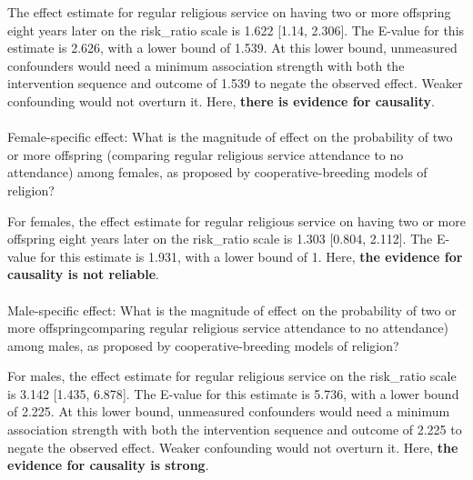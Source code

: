 \documentclass[
  single column]{article}
\makeatletter
\let\oldparagraph\paragraph
\renewcommand{\paragraph}{
    \@ifstar
      \xxxParagraphStar
      \xxxParagraphNoStar
  }
\newcommand{\xxxParagraphStar}[1]{\oldparagraph*{#1}\mbox{}}
\newcommand{\xxxParagraphNoStar}[1]{\oldparagraph{#1}\mbox{}}
\makeatother
\begin{document}
The effect estimate for regular religious service on having two or more
offspring eight years later on the risk\_ratio scale is 1.622 {[}1.14,
2.306{]}. The E-value for this estimate is 2.626, with a lower bound of
1.539. At this lower bound, unmeasured confounders would need a minimum
association strength with both the intervention sequence and outcome of
1.539 to negate the observed effect. Weaker confounding would not
overturn it. Here, \textbf{there is evidence for causality}.

\paragraph{Female-specific effect: What is the magnitude of effect on
the probability of two or more offspring (comparing regular religious
service attendance to no attendance) among females, as proposed by
cooperative-breeding models of
religion?}\label{female-specific-effect-what-is-the-magnitude-of-effect-on-the-probability-of-two-or-more-offspring-comparing-regular-religious-service-attendance-to-no-attendance-among-females-as-proposed-by-cooperative-breeding-models-of-religion}

For females, the effect estimate for regular religious service on having
two or more offspring eight years later on the risk\_ratio scale is
1.303 {[}0.804, 2.112{]}. The E-value for this estimate is 1.931, with a
lower bound of 1. Here, \textbf{the evidence for causality is not
reliable}.

\paragraph{Male-specific effect: What is the magnitude of effect on the
probability of two or more offspringcomparing regular religious service
attendance to no attendance) among males, as proposed by
cooperative-breeding models of
religion?}\label{male-specific-effect-what-is-the-magnitude-of-effect-on-the-probability-of-two-or-more-offspringcomparing-regular-religious-service-attendance-to-no-attendance-among-males-as-proposed-by-cooperative-breeding-models-of-religion}

For males, the effect estimate for regular religious service on the
risk\_ratio scale is 3.142 {[}1.435, 6.878{]}. The E-value for this
estimate is 5.736, with a lower bound of 2.225. At this lower bound,
unmeasured confounders would need a minimum association strength with
both the intervention sequence and outcome of 2.225 to negate the
observed effect. Weaker confounding would not overturn it. Here,
\textbf{the evidence for causality is strong}.
\end{document}
